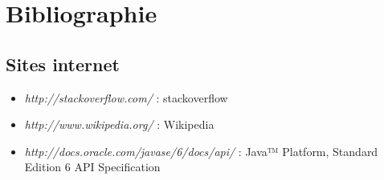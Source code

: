 \section*{Bibliographie} %

\subsection*{Sites internet}

\begin{itemize}
    \item \emph{http://stackoverflow.com/} : stackoverflow
    \item \emph{http://www.wikipedia.org/} : Wikipedia
    \item \emph{http://docs.oracle.com/javase/6/docs/api/} : 
        Java™ Platform, Standard Edition 6
        API Specification
\end{itemize}
